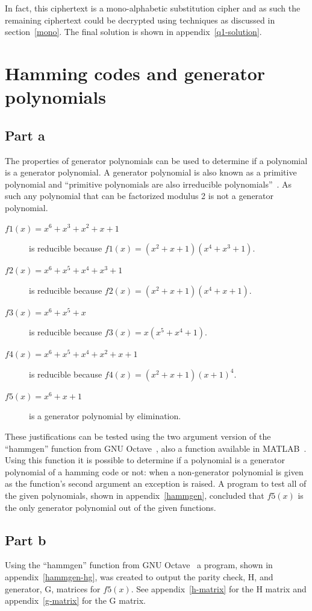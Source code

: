 \documentclass[pdftex, 11pt, a4paper]{article}
\begin{document}
In fact, this ciphertext is a mono-alphabetic substitution cipher and as such the remaining ciphertext could be decrypted using techniques as discussed in section~\ref{mono}.  The final solution is shown in appendix~\ref{q1-solution}.

\section{Hamming codes and generator polynomials}
\subsection{Part a}
The properties of generator polynomials can be used to determine if a polynomial
is a generator polynomial.  A generator polynomial is also known as a primitive
polynomial and ``primitive polynomials are also irreducible
polynomials''~\cite{wolfram-primative}.  As such any polynomial that can be
factorized modulus 2 is not a generator polynomial.

\begin{description}
    \item[$f1(x) = x^6 + x^3 + x^2 + x + 1$] is reducible because $f1(x) = (x^2+x+1)(x^4+x^3+1)$.
    \item[$f2(x) = x^6 + x^5 + x^4 + x^3 + 1$] is reducible because $f2(x) = (x^2+x+1)(x^4+x+1)$.
    \item[$f3(x) = x^6 + x^5 + x$] is reducible because $f3(x) = x(x^5 + x^4 + 1)$.
    \item[$f4(x) = x^6 + x^5 +x^4 + x^2 +x + 1$] is reducible because $f4(x) = (x^2+x+1)(x+1)^4$.
    \item[$f5(x) = x^6 + x + 1$] is a generator polynomial by elimination.
\end{description}

These justifications can be tested using the two argument version of the
``hammgen'' function from GNU Octave~\cite{hammgen-octave}, also a function
available in MATLAB~\cite{hammgen-matlab}. Using this function it is possible to
determine if a polynomial is a generator polynomial of a hamming code or not:
when a non-generator polynomial is given as the function's second argument an
exception is raised.  A program to test all of the given polynomials, shown in
appendix~\ref{hammgen}, concluded that $f5(x)$ is the only generator polynomial
out of the given functions.

\subsection{Part b}
Using the ``hammgen'' function from GNU Octave~\cite{hammgen-octave} a program,
shown in appendix~\ref{hammgen-hg}, was created to output the parity check,
H\label{parity-check}, and generator, G, matrices for $f5(x)$.
See appendix~\ref{h-matrix} for the H matrix and appendix~\ref{g-matrix} for the
G matrix.
\end{document}
